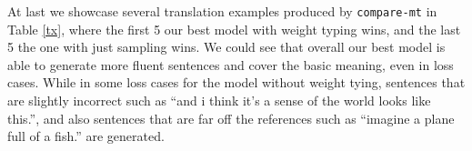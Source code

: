 \documentclass[11pt,a4paper]{article}
\begin{document}
At last we showcase several translation examples produced by \texttt{compare-mt} \cite{neubig19naacl} in Table \ref{tx}, where the first 5 our best model with weight typing wins, and the last 5 the one with just sampling wins. We could see that overall our best model is able to generate more fluent sentences and cover the basic meaning, even in loss cases. While in some loss cases for the model without weight tying, sentences that are slightly incorrect such as ``and i think it's a sense of the world looks like this.'', and also sentences that are far off the references such as ``imagine a plane full of a fish.'' are generated.



\end{document}
